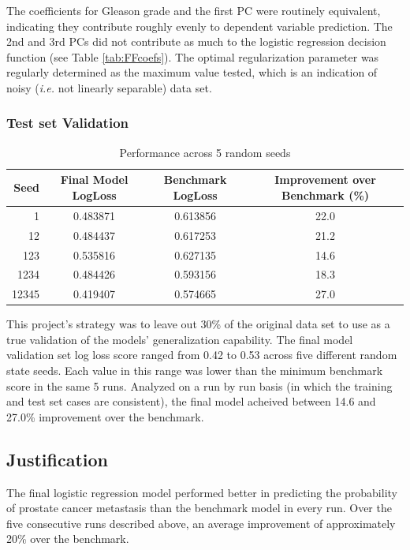 \documentclass[final]{article}
\begin{document}
The coefficients for Gleason grade and the first PC were routinely equivalent,
indicating they contribute roughly evenly to dependent variable prediction.  The
2nd and 3rd PCs did not contribute as much to the logistic regression decision
function (see Table \ref{tab:FFcoefs}).  The optimal regularization parameter
was regularly determined as the maximum value tested, which is an indication of
noisy (\textit{i.e.} not linearly separable) data set.


\subsubsection{Test set Validation}

\begin{table}[h]
\centering
\caption{Performance across 5 random seeds\label{tab:performance}}
\begin{tabular}[h]{ r c c c }
\hline
Seed & Final Model LogLoss & Benchmark LogLoss & Improvement over Benchmark (\%) \\  \hline
1 & 0.483871 & 0.613856 & 22.0 \\
12 & 0.484437 & 0.617253 & 21.2 \\
123 & 0.535816 & 0.627135 & 14.6 \\
1234 & 0.484426 & 0.593156 & 18.3 \\
12345 & 0.419407 & 0.574665 & 27.0 \\
\hline
\end{tabular}
\end{table}

This project's strategy was to leave out 30\% of the original data set to use as a
true validation of the models' generalization capability.  The final model validation
set log loss score ranged from 0.42 to 0.53 across five different random state
seeds.  Each value in this range was lower than the minimum benchmark score in the
same 5 runs.  Analyzed on a run by run basis (in which the training and test set cases
are consistent), the final model acheived between 14.6 and 27.0\% improvement over
the benchmark.

\subsection{Justification}

The final logistic regression model performed better in predicting the
probability of prostate cancer  metastasis than the benchmark model in every
run.  Over the five consecutive runs described above, an average improvement of
approximately 20\%  over the benchmark.
\end{document}
